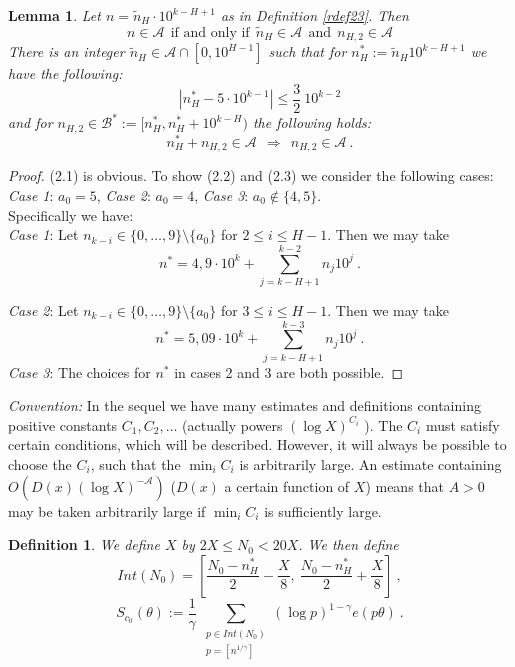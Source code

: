 \documentclass{amsart}
\newtheorem{lemma}[theorem]{Lemma}
\numberwithin{equation}{subsection}
\newtheorem{definition}[theorem]{Definition}
\begin{document}
\begin{lemma}\label{rlem24}
Let $n=\tilde{n}_H\cdot 10^{k-H+1}$ as in Definition \ref{rdef23}. Then
\[
n\in \mathcal{A}\ \ \text{if and only if}\ \ \tilde{n}_H\in \mathcal{A}\ \ \text{and}\ \ n_{H,2}\in\mathcal{A}\tag{2.1}
\]
There is an integer $\tilde{n}_H\in \mathcal{A}\cap [0, 10^{H-1}]$ such that for $n^*_H:= \tilde{n}_H 10^{k-H+1}$ we have the following:
\[
\left|n^*_H-5\cdot 10^{k-1}\right|\leq \frac{3}{2}\: 10^{k-2}  \tag{2.2}
\]
and for $n_{H, 2}\in \mathcal{B}^*:= [ n_H^*, n_H^*+10^{k-H} )$ the following holds:
\[
n^*_H+n_{H,2}\in \mathcal{A}\ \ \Rightarrow\ \ n_{H, 2}\in \mathcal{A}\:.  \tag{2.3}
\]
\end{lemma}
\begin{proof}
(2.1) is obvious. To show (2.2) and (2.3) we consider the following cases:\\
\textit{Case 1}: $a_0=5$, \textit{Case 2}: $a_0=4$, \textit{Case 3}: $a_0\not\in \{4, 5\}$.\\
Specifically we have:\\
\noindent \textit{Case 1}: Let $n_{k-i}\in \{0, \ldots, 9\}\setminus\{a_0\}$ for $2\leq i\leq H-1$. Then we may take
$$n^*=4,9\cdot 10^k+\sum_{j=k-H+1}^{k-2} n_j10^j\:.$$

\noindent \textit{Case 2}: Let  $n_{k-i}\in \{0, \ldots, 9\}\setminus\{a_0\}$ for $3\leq i\leq H-1$. Then we may take
$$n^*=5,09\cdot 10^k+\sum_{j=k-H+1}^{k-3} n_j10^j\:.$$
\noindent \textit{Case 3}: The choices for $n^*$ in cases 2 and 3 are both possible.
\end{proof}


\textit{Convention:} In the sequel we have many estimates and definitions containing positive constants $C_1, C_2, \ldots$ (actually powers $(\log X)^{C_i}$ ). The $C_i$ must satisfy certain conditions, which will be described. However, it will always be possible to choose the $C_i$, such that the $\min_{i} C_i$ is arbitrarily large. An estimate containing $O\left(D(x)(\log X)^{-\mathcal{A}}\right)$ ($D(x)$ a certain function of $X$) means that $A>0$ may be taken arbitrarily large if $\min_i C_i$ is sufficiently large.


\begin{definition}\label{rdef25}
We define $X$ by $2X\leq N_0< 20 X$. We then define 
\[
Int(N_0)=\left[ \frac{N_0-n_H^*}{2}-\frac{X}{8},\  \frac{N_0-n_H^*}{2}+\frac{X}{8} \right]\:, \tag{2.4}
\]
\[
S_{c_0}(\theta):=\frac{1}{\gamma}\ \sum_{\substack{p \in Int(N_0) \\ p=[n^{1/\gamma}]}} (\log  p)^{1-\gamma} e(p\theta)\:.   
\]
\end{definition}
\end{document}
